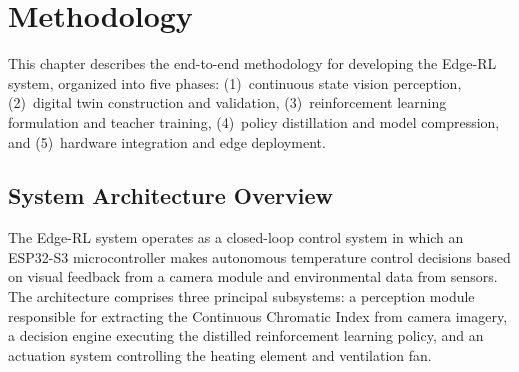 
\chapter{Methodology}
    \label{ch:Methodology}

    This chapter describes the end-to-end methodology for developing the Edge-RL system, organized into five phases: (1)~continuous state vision perception, (2)~digital twin construction and validation, (3)~reinforcement learning formulation and teacher training, (4)~policy distillation and model compression, and (5)~hardware integration and edge deployment.



\section{System Architecture Overview}
    \label{sec:System Architecture}

    The Edge-RL system operates as a closed-loop control system in which an ESP32-S3 microcontroller makes autonomous temperature control decisions based on visual feedback from a camera module and environmental data from sensors. The architecture comprises three principal subsystems: a perception module responsible for extracting the Continuous Chromatic Index from camera imagery, a decision engine executing the distilled reinforcement learning policy, and an actuation system controlling the heating element and ventilation fan.

